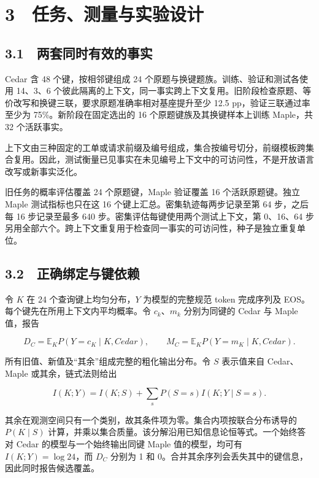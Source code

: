 \documentclass[UTF8,fontset=fandol,10pt,a4paper]{ctexart}
\begin{document}
\section*{3　任务、测量与实验设计}
\subsection*{3.1　两套同时有效的事实}
Cedar 含 48 个键，按相邻键组成 24 个原题与换键题族。训练、验证和测试各使用 14、3、6 个彼此隔离的上下文，同一事实跨上下文复用。旧阶段检查原题、等价改写和换键三联，要求原题准确率相对基座提升至少 12.5 pp，验证三联通过率至少为 75\%。新阶段在固定选出的 16 个原题键族及其换键样本上训练 Maple，共 32 个活跃事实。



上下文由三种固定的工单或请求前缀及编号组成，集合按编号切分，前缀模板跨集合复用。因此，测试衡量已见事实在未见编号上下文中的可访问性，不是开放语言改写或新事实泛化。



旧任务的概率评估覆盖 24 个原题键，Maple 验证覆盖 16 个活跃原题键。独立 Maple 测试指标也只在这 16 个键上汇总。密集轨迹每两步记录至第 64 步，之后每 16 步记录至最多 640 步。密集评估每键使用两个测试上下文，第 0、16、64 步另用全部六个。跨上下文重复用于检查同一事实的可访问性，种子是独立重复单位。



\subsection*{3.2　正确绑定与键依赖}
令 $K$ 在 24 个查询键上均匀分布，$Y$ 为模型的完整规范 token 完成序列及 EOS。每个键先在所用上下文内平均概率。令 $c_k$、$m_k$ 分别为同键的 Cedar 与 Maple 值，报告



\[
D_C=\mathbb{E}_K P(Y=c_K\mid K,Cedar),\qquad
M_C=\mathbb{E}_K P(Y=m_K\mid K,Cedar).
\]



所有旧值、新值及“其余”组成完整的粗化输出分布。令 $S$ 表示值来自 Cedar、Maple 或其余，链式法则给出



\[
I(K;Y)=I(K;S)+\sum_s P(S=s)I(K;Y\mid S=s).
\]



其余在观测空间只有一个类别，故其条件项为零。集合内项按联合分布诱导的 $P(K\mid S)$ 计算，并乘以集合质量。该分解沿用已知信息论恒等式。一个始终答对 Cedar 的模型与一个始终输出同键 Maple 值的模型，均可有 $I(K;Y)=\log 24$，而 $D_C$ 分别为 1 和 0。合并其余序列会丢失其中的键信息，因此同时报告候选覆盖。
\end{document}
